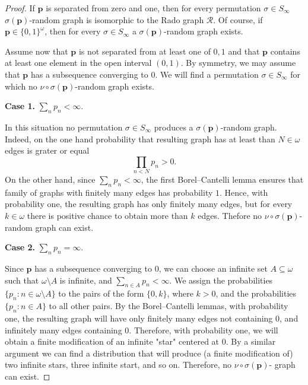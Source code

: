 \documentclass{amsart}
\theoremstyle{plain}
\theoremstyle{definition}
\theoremstyle{remark}
\numberwithin{equation}{section}
\begin{document}
\begin{proof}
If \(\mathbf p\) is separated from zero and one, then for every permutation \(\sigma\in S_\infty\) \(\sigma(\mathbf p)\)-random graph is isomorphic to the Rado graph \(\mathcal R\).  Of course, if \(\mathbf p\in\{0,1\}^\omega\), then for every \(\sigma\in S_\infty\) a \(\sigma(\mathbf p)\)-random graph exists.

Assume now that \(\mathbf p\) is not separated from at least one of \(0,1\) and that \(\mathbf p\) contains at least one element in the open interval \((0,1)\).  By symmetry, we may assume that \(\mathbf p\) has a subsequence converging to \(0\).  We will find a permutation \(\sigma\in S_\infty\) for which no \(\nu\circ\sigma(\mathbf p)\)-random graph exists. 

\textbf{Case 1.} \(\sum\limits_n p_n<\infty\).

In this situation no permutation \(\sigma\in S_\infty\) produces a \(\sigma(\mathbf p)\)-random graph. Indeed, on the one hand probability that resulting graph has at least than $N \in \omega$ edges is grater or equal 
$$\prod\limits_{n <N} p_n>0.$$ 
On the other hand, since \(\sum\limits_n p_n<\infty\), the first Borel--Cantelli lemma ensures that family of graphs with finitely many edges has probability $1$.  Hence, with probability one, the resulting graph has only finitely many edges, but for every \(k \in \omega\) there is positive chance to obtain more than \(k\) edges. Thefore no $\nu\circ \sigma(\mathbf{p})$-random graph can exist.


\medskip

\textbf{Case 2.} \(\sum\limits_n p_n=\infty\).

Since \(\mathbf p\) has a subsequence converging to \(0\), we can choose an infinite set \(A\subseteq\omega\) such that \(\omega\setminus A\) is infinite, and \(\sum\limits_{n\in A}p_n<\infty\).  
We assign the probabilities $\{p_n : n \in \omega\setminus A\}$ to the pairs of the form $\{0,k\}$, where $k>0$, and the probabilities $\{p_n: n \in A\}$ to all other pairs. By the Borel--Cantelli lemmas, with probability one, the resulting graph will have only finitely many edges not containing $0$, and infinitely many edges containing $0$. Therefore, with probability one, we will obtain a finite modification of an infinite "star" centered at $0$. By a similar argument we can find a distribution that will produce (a finite modification of) two infinite stars, three infinite start, and so on. Therefore, no $\nu\circ\sigma(\mathbf{p})$- graph can exist.


\end{proof}
\end{document}
